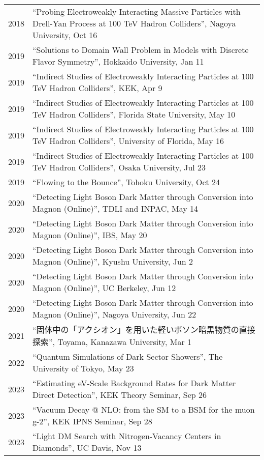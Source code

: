\documentclass[12pt]{article}
\begin{document}
\begin{table}[H]\begin{tabular}{lp{6in}}2018 & ``Probing Electroweakly Interacting Massive Particles with Drell-Yan Process at 100 TeV Hadron Colliders'', Nagoya University, Oct 16 \\2019 & ``Solutions to Domain Wall Problem in Models with Discrete Flavor Symmetry'', Hokkaido University, Jan 11 \\2019 & ``Indirect Studies of Electroweakly Interacting Particles at 100 TeV Hadron Colliders'', KEK, Apr 9 \\2019 & ``Indirect Studies of Electroweakly Interacting Particles at 100 TeV Hadron Colliders'', Florida State University, May 10 \\2019 & ``Indirect Studies of Electroweakly Interacting Particles at 100 TeV Hadron Colliders'', University of Florida, May 16 \\2019 & ``Indirect Studies of Electroweakly Interacting Particles at 100 TeV Hadron Colliders'', Osaka University, Jul 23 \\2019 & ``Flowing to the Bounce'', Tohoku University, Oct 24 \\2020 & ``Detecting Light Boson Dark Matter through Conversion into Magnon (Online)'', TDLI and INPAC, May 14 \\2020 & ``Detecting Light Boson Dark Matter through Conversion into Magnon (Online)'', IBS, May 20 \\2020 & ``Detecting Light Boson Dark Matter through Conversion into Magnon (Online)'', Kyushu University, Jun 2 \\2020 & ``Detecting Light Boson Dark Matter through Conversion into Magnon (Online)'', UC Berkeley, Jun 12 \\2020 & ``Detecting Light Boson Dark Matter through Conversion into Magnon (Online)'', Nagoya University, Jun 22 \\2021 & ``固体中の「アクシオン」を用いた軽いボソン暗黒物質の直接探索'', Toyama, Kanazawa University, Mar 1 \\2022 & ``Quantum Simulations of Dark Sector Showers'', The University of Tokyo, May 23 \\2023 & ``Estimating eV-Scale Background Rates for Dark Matter Direct Detection'', KEK Theory Seminar, Sep 26 \\2023 & ``Vacuum Decay @ NLO: from the SM to a BSM for the muon g-2'', KEK IPNS Seminar, Sep 28 \\2023 & ``Light DM Search with Nitrogen-Vacancy Centers in Diamonds'', UC Davis, Nov 13 \\\end{tabular}\end{table}
\end{document}
